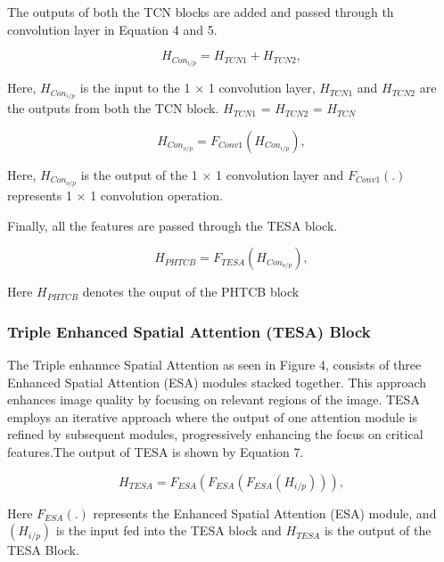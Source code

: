 \documentclass{ieeeaccess}
\begin{document}
The outputs of both the TCN blocks are added and passed through th convolution layer in Equation 4 and 5.

\begin{equation}
{H_{Con_{i/p}}}= {H_{TCN1}} + {H_{TCN2}},
\end{equation}

Here, ${H_{Con_{i/p}}}$ is the input to the 1 $\times$ 1 convolution layer, ${H_{TCN1}}$ and ${H_{TCN2}}$ are the outputs from both the TCN block. ${H_{TCN1}}$ = ${H_{TCN2}}$ = ${H_{TCN}}$

\begin{equation}
{H_{Con_{o/p}}}= {F_{Conv1}}({H_{Con_{i/p}}}),
\end{equation}

Here, ${H_{Con_{o/p}}}$ is the output of the 1 $\times$ 1 convolution layer and ${F_{Conv1}}$$(.)$ represents 1 $\times$ 1 convolution operation.

Finally, all the features are passed through the TESA block.

\begin{equation}
{H_{PHTCB}}= {F_{TESA}}({H_{Con_{o/p}}}),
\end{equation}

Here ${H_{PHTCB}}$ denotes the ouput of the PHTCB block


\subsubsection{Triple Enhanced Spatial Attention (TESA) Block}

The Triple enhannce Spatial Attention as seen in Figure 4, consists of three Enhanced Spatial Attention (ESA) modules stacked together. This approach enhances image quality by focusing on relevant regions of the image. TESA employs an iterative approach where the output of one attention module is refined by subsequent modules, progressively enhancing the focus on critical features.The output of TESA is shown by Equation 7.

\begin{equation}
{H_{TESA}}= {F_{ESA}}({F_{ESA}}({F_{ESA}}({H_{i/p}}))),
\end{equation}

Here ${F_{ESA}}$$(.)$ represents the Enhanced Spatial Attention (ESA) module, and $({H_{i/p}})$ is the input fed into the TESA block and  ${H_{TESA}}$ is the output of the TESA Block.
\end{document}
